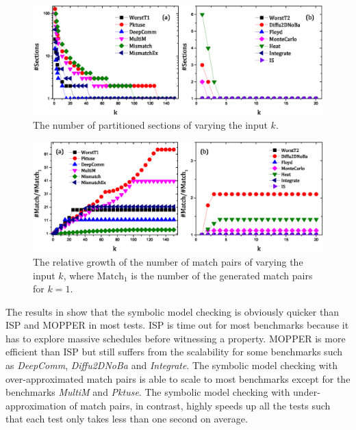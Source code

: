 \examplefigtemplate

\begin{figure}[h]
\centering
\includegraphics[scale=0.65]{fig/figure3a-3b_ex.eps}
\caption{The number of partitioned sections of varying the input $k$.}
\label{fig:relation:section}
\end{figure}


\begin{figure}[h]
\centering
\includegraphics[scale=0.65]{fig/figure4a-4b_ex.eps}
\caption{The relative growth of the number of match pairs of varying the input $k$, where $\mathrm{Match}_1$ is the number of the generated match pairs for $k=1$.}
\label{fig:relation:match}
\end{figure}

The results in  show that the symbolic model checking is obviously quicker than ISP and MOPPER in most tests. ISP is time out for most benchmarks because it has to explore massive schedules before witnessing a property. MOPPER is more efficient than ISP but still suffers from the scalability for some benchmarks such as \textit{DeepComm}, \textit{Diffu2DNoBa} and \textit{Integrate}. 
The symbolic model checking with over-approximated match pairs is able to scale to most benchmarks except for the benchmarks \textit{MultiM} and \textit{Pktuse}. 
The symbolic model checking with under-approximation of match pairs, in contrast, highly speeds up all the tests such that each test only takes less than one second on average.

